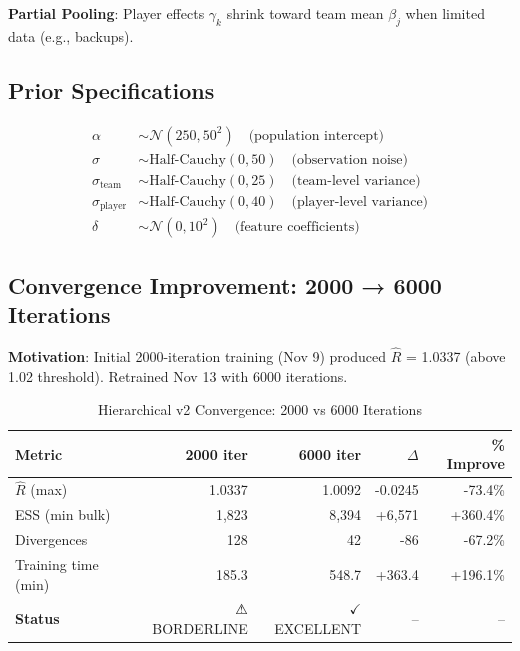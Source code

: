 \textbf{Partial Pooling}: Player effects $\gamma_k$ shrink toward team mean $\beta_j$ when limited data (e.g., backups).

\subsection{Prior Specifications}

\begin{align}
\alpha &\sim \mathcal{N}(250, 50^2) \quad \text{(population intercept)} \\
\sigma &\sim \text{Half-Cauchy}(0, 50) \quad \text{(observation noise)} \\
\sigma_{\text{team}} &\sim \text{Half-Cauchy}(0, 25) \quad \text{(team-level variance)} \\
\sigma_{\text{player}} &\sim \text{Half-Cauchy}(0, 40) \quad \text{(player-level variance)} \\
\delta &\sim \mathcal{N}(0, 10^2) \quad \text{(feature coefficients)}
\label{eq:hierarchical-priors}
\end{align}

\subsection{Convergence Improvement: 2000 → 6000 Iterations}

\textbf{Motivation}: Initial 2000-iteration training (Nov 9) produced $\hat{R}$ = 1.0337 (above 1.02 threshold). Retrained Nov 13 with 6000 iterations.

\begin{table}[htbp]
\centering
\caption{Hierarchical v2 Convergence: 2000 vs 6000 Iterations}
\label{tab:hierarchical-convergence-improvement}
\begin{tabular}{lrrrr}
\toprule
\textbf{Metric} & \textbf{2000 iter} & \textbf{6000 iter} & \textbf{$\Delta$} & \textbf{\% Improve} \\
\midrule
$\hat{R}$ (max) & 1.0337 & 1.0092 & -0.0245 & -73.4\% \\
ESS (min bulk) & 1,823 & 8,394 & +6,571 & +360.4\% \\
Divergences & 128 & 42 & -86 & -67.2\% \\
Training time (min) & 185.3 & 548.7 & +363.4 & +196.1\% \\
\midrule
\textbf{Status} & ⚠ BORDERLINE & $\checkmark$ EXCELLENT & -- & -- \\
\bottomrule
\end{tabular}
\end{table}

